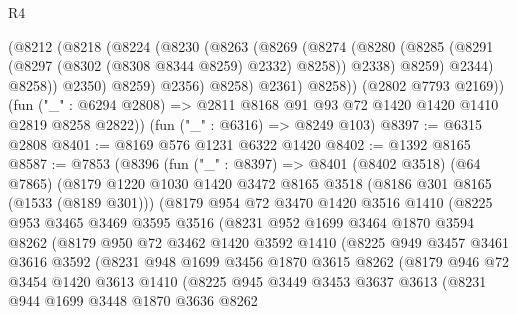 \begin{lexlean}{R4}
\begin{coremodule}
              (@8212
                (@8218
                  (@8224
                    (@8230
                      (@8263
                        (@8269
                          (@8274
                            (@8280
                              (@8285 (@8291 (@8297 (@8302 (@8308 @8344 @8259) @2332) @8258)) @2338)
                              @8259)
                            @2344)
                          @8258))
                      @2350)
                    @8259)
                  @2356)
                @8258)
              @2361)
            @8258))
        (@2802 @7793 @2169))
      (fun ("_" : @6294 @2808) => @2811 @8168 @91 @93 @72 @1420 @1420 @1410 @2819 @8258 @2822))
    (fun ("_" : @6316) => @8249 @103)
@8397 := @6315 @2808
@8401 := @8169 @576 @1231 @6322 @1420
@8402 := @1392 @8165
@8587 := @7853
    (@8396
      (fun ("_" : @8397) =>
      @8401
        (@8402 @3518)
        (@64 @7865)
        (@8179
          @1220
          @1030
          @1420
          @3472
          @8165
          @3518
          (@8186 @301 @8165 (@1533 (@8189 @301)))
          (@8179
            @954
            @72
            @3470
            @1420
            @3516
            @1410
            (@8225
              @953
              @3465
              @3469
              @3595
              @3516
              (@8231
                @952
                @1699
                @3464
                @1870
                @3594
                @8262
                (@8179
                  @950
                  @72
                  @3462
                  @1420
                  @3592
                  @1410
                  (@8225
                    @949
                    @3457
                    @3461
                    @3616
                    @3592
                    (@8231
                      @948
                      @1699
                      @3456
                      @1870
                      @3615
                      @8262
                      (@8179
                        @946
                        @72
                        @3454
                        @1420
                        @3613
                        @1410
                        (@8225
                          @945
                          @3449
                          @3453
                          @3637
                          @3613
                          (@8231
                            @944
                            @1699
                            @3448
                            @1870
                            @3636
                            @8262

\end{coremodule}
\end{lexlean}
